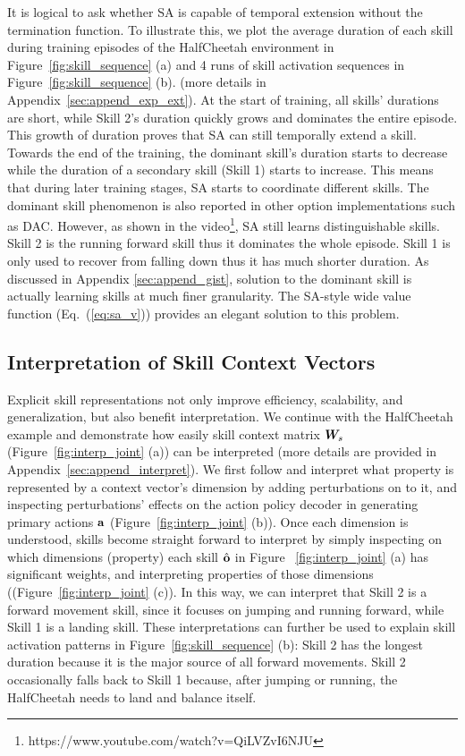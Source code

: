 It is logical to ask whether SA is capable of temporal extension
without the termination function. To illustrate this, we plot the
average duration of each skill during training episodes of the
HalfCheetah environment in Figure~\ref{fig:skill_sequence} (a)
and 4 runs of skill activation sequences in
Figure~\ref{fig:skill_sequence} (b). (more details in
Appendix~\ref{sec:append_exp_ext}). At the start of training, all
skills' durations are short, while Skill 2's duration quickly
grows and dominates the entire episode. This growth of duration
proves that SA can still temporally extend a skill. Towards the
end of the training, the dominant skill's duration starts to
decrease while the duration of a secondary skill (Skill 1) starts
to increase. This means that during later training stages, SA
starts to coordinate different skills. The dominant skill
phenomenon is also reported in other option implementations such
as DAC. However, as shown in the
video\footnote{https://www.youtube.com/watch?v=QiLVZvI6NJU}, SA
still learns distinguishable skills. Skill 2 is the running
forward skill thus it dominates the whole episode. Skill 1 is
only used to recover from falling down thus it has much shorter
duration. As discussed in Appendix \ref{sec:append_gist},
solution to the dominant skill is actually learning skills at
much finer granularity. The SA-style wide value function
(Eq.~(\ref{eq:sa_v})) provides an elegant solution to this
problem.

\vspace{-2mm}
\subsection{Interpretation of Skill Context Vectors}
\label{sec:interpret}

Explicit skill representations not only improve efficiency,
scalability, and generalization, but also benefit interpretation.
We continue with the HalfCheetah example and demonstrate how
easily skill context matrix ${\bm{W}}_s$
(Figure~\ref{fig:interp_joint} (a)) can be interpreted (more
details are provided in Appendix~\ref{sec:append_interpret}). We
first follow  and interpret what
property is represented by a context vector's dimension by adding
perturbations on to it, and inspecting perturbations' effects
on the action policy decoder in generating primary actions ${\mathbf{a}}$
(Figure~\ref{fig:interp_joint} (b)). Once each dimension is
understood, skills become straight forward to interpret by simply
inspecting on which dimensions (property) each skill $\hat{{\mathbf{o}}}$
in Figure ~\ref{fig:interp_joint} (a) has significant weights,
and interpreting properties of those dimensions
((Figure~\ref{fig:interp_joint} (c)). In this way, we can
interpret that Skill 2 is a forward movement skill, since it
focuses on jumping and running forward, while Skill 1 is a
landing skill. These interpretations can further be used to
explain skill activation patterns in
Figure~\ref{fig:skill_sequence} (b): Skill 2 has the longest
duration because it is the major source of all forward movements.
Skill 2 occasionally falls back to Skill 1 because, after jumping
or running, the HalfCheetah needs to land and balance itself.


